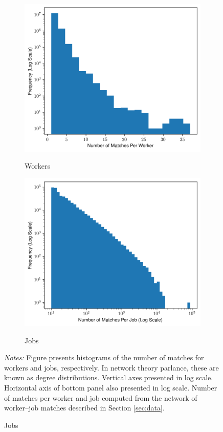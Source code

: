 \documentclass[12pt]{article}
\theoremstyle{definition}
\theoremstyle{plain}
\begin{document}
\begin{figure}
	\centering
	\caption{Distributions of Number of Matches Per Worker and Job}
	\begin{subfigure}{\textwidth}
		\centering
		\caption{Workers}
		\includegraphics[width=0.7\linewidth]{../Results/summary_stats/worker_degree_distribution_hist}
		\label{fig:worker_degree_distribution_hist}
	\end{subfigure}
	\begin{subfigure}{\textwidth}
		\centering
		\caption{Jobs}
		\includegraphics[width=0.7\linewidth]{../Results/summary_stats/job_degree_distribution_hist}
		\label{fig:job_degree_distribution_hist}
	\end{subfigure}
	\label{fig:degree_distribution_hist}
	\footnotesize\flushleft \emph{Notes:} Figure presents histograms of the number of matches for workers and jobs, respectively. In network theory parlance, these are known as degree distributions. Vertical axes presented in log scale. Horizontal axis of bottom panel also presented in log scale. Number of matches per worker and job computed from the network of worker--job matches described in Section \ref{sec:data}.
\end{figure}
\end{document}
